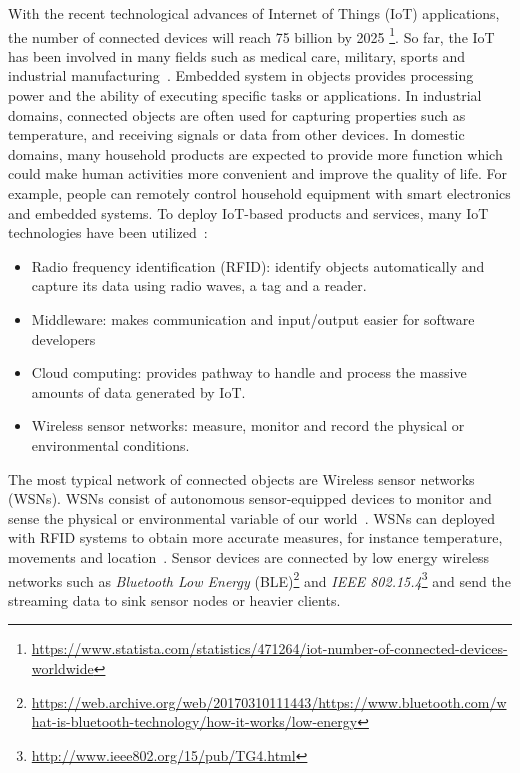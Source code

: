 With the recent technological advances of Internet of Things (IoT) applications,
the number of connected devices will reach 75 billion by 2025
\footnote{\url{https://www.statista.com/statistics/471264/iot-number-of-connected-devices-worldwide}}.
So far, the IoT has been involved in many fields such as medical care, military,
sports and industrial manufacturing~\cite{boudargham2017exhaustive,
lai2013survey, da2014internet}. Embedded system in objects provides processing power and the ability of executing specific tasks or applications.
In industrial domains, connected objects are
often used for capturing properties such as temperature, and receiving signals or
data from other devices.
In domestic domains, many household products are expected to
provide more function which could make human activities more convenient and
improve the quality of life. For example, people can remotely control household
equipment with smart electronics and embedded systems.  To deploy IoT-based products
and services, many IoT technologies have been utilized~\cite{lee2015internet}:
\begin{itemize}
    \item Radio frequency identification (RFID): identify objects automatically
    and capture its data using radio waves, a tag and a reader.
    \item Middleware: makes communication and input/output easier for software
    developers
    \item Cloud computing: provides pathway to handle and process the massive
    amounts of data generated by IoT.
    \item Wireless sensor networks: measure, monitor and record the physical
    or environmental conditions.
\end{itemize}

The most typical network of connected objects are Wireless sensor networks (WSNs). WSNs consist of
autonomous sensor-equipped devices to monitor and sense the physical or
environmental variable of our world~\cite{lee2015internet, li2016temporal}. WSNs
can deployed with RFID systems to obtain more accurate measures, for instance
temperature, movements and location~\cite{lee2015internet, atzori2010b}. Sensor
devices are connected by low energy wireless networks such as
\emph{Bluetooth Low Energy}
(BLE)\footnote{\url{https://web.archive.org/web/20170310111443/https://www.bluetooth.com/what-is-bluetooth-technology/how-it-works/low-energy}}
and \emph{IEEE 802.15.4}\footnote{\url{http://www.ieee802.org/15/pub/TG4.html}}
and send the streaming data to sink sensor nodes or heavier clients.

